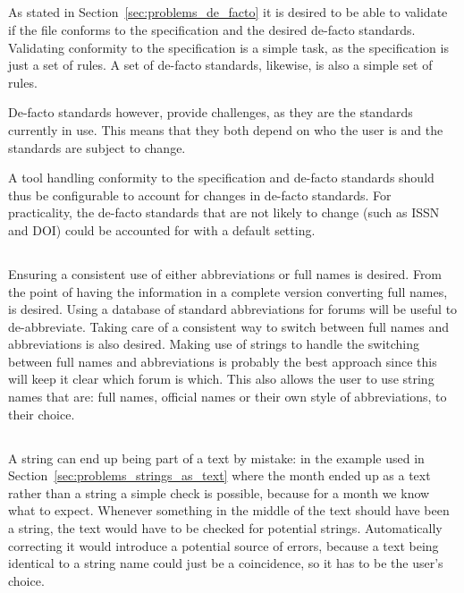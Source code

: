 \subsection{}

As stated in Section~\ref{sec:problems_de_facto} it is desired to be
able to validate if the file conforms to the specification and the
desired de-facto standards.  Validating conformity to the
specification is a simple task, as the specification is just a set of
rules.  A set of de-facto standards, likewise, is also a simple set of
rules.

De-facto standards however, provide challenges, as they are the
standards currently in use.  This means that they both depend on who
the user is and the standards are subject to change.

A tool handling conformity to the specification and de-facto standards
should thus be configurable to account for changes in de-facto
standards.  For practicality, the de-facto standards that are not
likely to change (such as ISSN and DOI) could be accounted for with a
default setting.


\subsection{}

Ensuring a consistent use of either abbreviations or full names is
desired.  From the point of having the information in a complete
version converting full names,  is desired.
Using a database of standard abbreviations for forums will be useful
to de-abbreviate.  Taking care of a consistent way to switch between
full names and abbreviations is also desired.  Making use of strings
to handle the switching between full names and abbreviations is
probably the best approach since this will keep it clear which forum
is which.  This also allows the user to use string names that are:
full names, official names or their own style of abbreviations, to
their choice.


\subsection{}

A {\bibtex} string can end up being part of a text by mistake: in the
example used in Section~\ref{sec:problems_strings_as_text} where the
month ended up as a text rather than a string a simple check is
possible, because for a month we know what to expect.  Whenever
something in the middle of the text should have been a string, the
text would have to be checked for potential strings.  Automatically
correcting it would introduce a potential source of errors, because a
text being identical to a string name could just be a coincidence, so
it has to be the user's choice.


